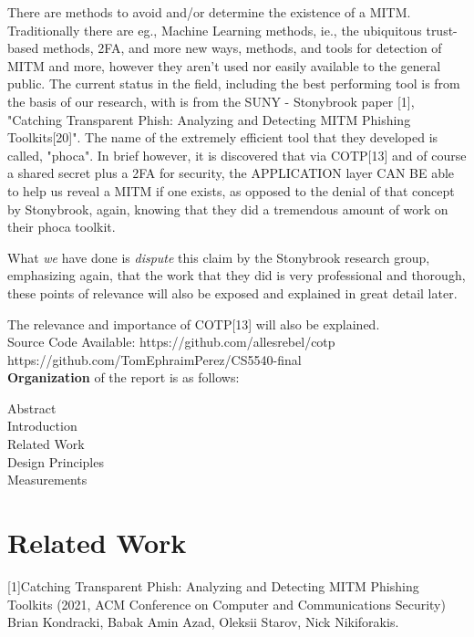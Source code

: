 \documentclass[a4paper, 11pt]{article} 				%
\begin{document}
There are methods to avoid and/or determine the existence of a MITM. Traditionally there are eg., Machine Learning methods, ie., the ubiquitous trust-based methods, 2FA, and more new ways, methods, and tools for detection of MITM and more, however they aren't used nor easily available to the general public.
The current status in the field, including the best performing tool is from the basis of our research, with is from the SUNY - Stonybrook paper [1], "Catching Transparent Phish: Analyzing and Detecting MITM  Phishing Toolkits[20]". The name of the extremely efficient tool that they developed is called, "phoca". In brief however, it is discovered that via COTP[13] and of course a shared secret plus a 2FA for security, the APPLICATION layer CAN BE able to help us reveal a MITM if one exists, as opposed to the denial of that concept by Stonybrook, again, knowing that they did a tremendous amount of work on their phoca toolkit. 

What \textit{we} have done is \textit{dispute} this claim by the Stonybrook research group, emphasizing again, that the work that they did is very professional and thorough, these points of relevance will also be exposed and explained in great detail later. 

\noindent
The relevance and importance of COTP[13] will also be explained.\\

\noindent
Source Code Available: https://github.com/allesrebel/cotp\\
https://github.com/TomEphraimPerez/CS5540-final\\
\textbf{Organization} of the report is as follows:

\noindent
Abstract\\
Introduction\\
Related Work\\
Design Principles\\
Measurements\\



\section{Related Work}
[1]Catching Transparent Phish: Analyzing and Detecting MITM Phishing Toolkits (2021, ACM Conference on Computer and Communications Security)
Brian Kondracki, Babak Amin Azad, Oleksii Starov, Nick Nikiforakis.\\
\end{document}
